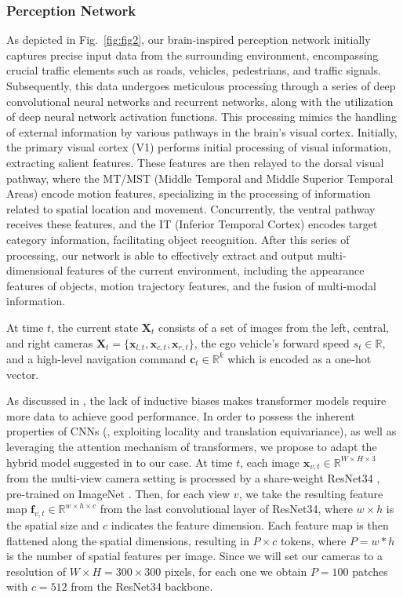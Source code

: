 \subsubsection{Perception Network}
As depicted in Fig.~\ref{fig:fig2}, our brain-inspired perception network initially captures precise input data from the surrounding environment, encompassing crucial traffic elements such as roads, vehicles, pedestrians, and traffic signals. 
Subsequently, this data undergoes meticulous processing through a series of deep convolutional neural networks and recurrent networks, along with the utilization of deep neural network activation functions. 
This processing mimics the handling of external information by various pathways in the brain's visual cortex. 
Initially, the primary visual cortex (V1) performs initial processing of visual information, extracting salient features.
These features are then relayed to the dorsal visual pathway, where the MT/MST (Middle Temporal and Middle Superior Temporal Areas) encode motion features, specializing in the processing of information related to spatial location and movement.
Concurrently, the ventral pathway receives these features, and the IT (Inferior Temporal Cortex) encodes target category information, facilitating object recognition. 
After this series of processing, our network is able to effectively extract and output multi-dimensional features of the current environment, including the appearance features of objects, motion trajectory features, and the fusion of multi-modal information.

At time $t$, the current state $\mathbf{X}_t$ consists of a set of images from the left, central, and right cameras $\mathbf{X}_{t}=\{\mathbf{x}_{l,t}, \mathbf{x}_{c,t}, \mathbf{x}_{r,t} \}$, the ego vehicle's forward speed $s_t\in\mathbb{R}$, and a high-level navigation command $\mathbf{c}_t\in\mathbb{R}^{k}$ which is encoded as a one-hot vector. 


As discussed in \cite{Alexey:2021}, the lack of inductive biases makes transformer models require more data to achieve good performance. 
In order to possess the inherent properties of CNNs (\ie, exploiting locality and translation equivariance), as well as leveraging the attention mechanism of transformers, we propose to adapt the hybrid model suggested in \cite{Alexey:2021} to our case. 
At time $t$, each image $\mathbf{x}_{v,t}\in \mathbb{R}^{W\times H\times 3}$ from the multi-view camera setting is processed by a share-weight ResNet34 \cite{He:2016}, pre-trained on ImageNet \cite{Deng:2009}. 
Then, for each view $v$, we take the resulting feature map $\mathbf{f}_{v,t}\in\mathbb{R}^{w\times h\times c}$ from the last convolutional layer of ResNet34, where $w\times h$ is the spatial size and $c$ indicates the feature dimension. 
Each feature map is then flattened along the spatial dimensions, resulting in $P\times c$ tokens, where $P=w*h$ is the number of spatial features per image. 
Since we will set our cameras to a resolution of $W\times H=300\times300$ pixels, for each one we obtain  $P=100$ patches with $c=512$ from the ResNet34 backbone. 


